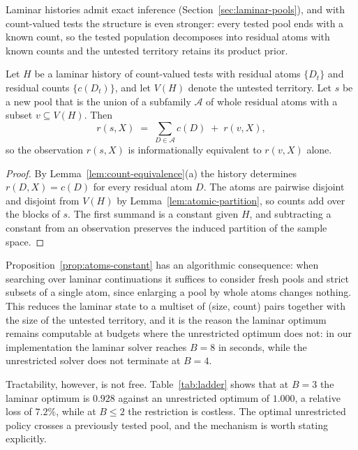 Laminar histories admit exact inference (Section~\ref{sec:laminar-pools}), and
with count-valued tests the structure is even stronger: every tested pool ends
with a known count, so the tested population decomposes into residual atoms with
known counts and the untested territory retains its product prior.

\begin{proposition}
\label{prop:atoms-constant}
Let $H$ be a laminar history of count-valued tests with residual atoms
$\{D_t\}$ and residual counts $\{c(D_t)\}$, and let $V(H)$ denote the untested
territory. Let $s$ be a new pool that is the union of a subfamily
$\mathcal{A}$ of whole residual atoms with a subset $v\subseteq V(H)$. Then
\[
  r(s,X) \;=\; \sum_{D\in\mathcal{A}} c(D) \;+\; r(v,X),
\]
so the observation $r(s,X)$ is informationally equivalent to $r(v,X)$ alone.
\end{proposition}

\begin{proof}
By Lemma~\ref{lem:count-equivalence}(a) the history determines $r(D,X)=c(D)$ for
every residual atom $D$. The atoms are pairwise disjoint and disjoint from
$V(H)$ by Lemma~\ref{lem:atomic-partition}, so counts add over the blocks of
$s$. The first summand is a constant given $H$, and subtracting a constant from
an observation preserves the induced partition of the sample space.
\end{proof}

Proposition~\ref{prop:atoms-constant} has an algorithmic consequence: when
searching over laminar continuations it suffices to consider fresh pools and
strict subsets of a single atom, since enlarging a pool by whole atoms changes
nothing. This reduces the laminar state to a multiset of (size, count) pairs
together with the size of the untested territory, and it is the reason the
laminar optimum remains computable at budgets where the unrestricted optimum
does not: in our implementation the laminar solver reaches $B=8$ in seconds,
while the unrestricted solver does not terminate at $B=4$.

Tractability, however, is not free. Table~\ref{tab:ladder} shows that at $B=3$
the laminar optimum is $0.928$ against an unrestricted optimum of $1.000$, a
relative loss of $7.2\%$, while at $B\le2$ the restriction is costless. The
optimal unrestricted policy crosses a previously tested pool, and the mechanism
is worth stating explicitly.

